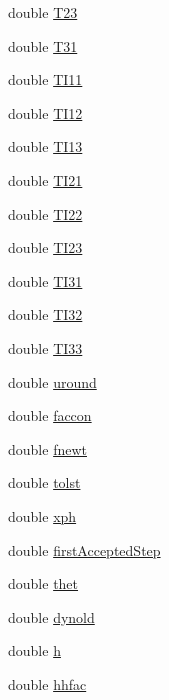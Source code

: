 \begin{DoxyCompactItemize}
double \hyperlink{classodes_1_1Radau5cc_a7a1d50f08a07a822568cbe9d52b75d45}{T23}
\item 
double \hyperlink{classodes_1_1Radau5cc_ab80295b9270d7ac0dde3e7d36dcff866}{T31}
\item 
double \hyperlink{classodes_1_1Radau5cc_a50cc7d8eee62bccf6069a4c1f43d019b}{T\+I11}
\item 
double \hyperlink{classodes_1_1Radau5cc_aaed25bf9d94e2cbbbeed75c093c0406f}{T\+I12}
\item 
double \hyperlink{classodes_1_1Radau5cc_a6da247a0623462bb1d61e5c97d67a39f}{T\+I13}
\item 
double \hyperlink{classodes_1_1Radau5cc_a14b80d1886a7562f3a72ce7acd738272}{T\+I21}
\item 
double \hyperlink{classodes_1_1Radau5cc_a77584ef2a5a6cccef4fe531e95c800d7}{T\+I22}
\item 
double \hyperlink{classodes_1_1Radau5cc_aafd01d1393c2dbe3edc148f073bf24f6}{T\+I23}
\item 
double \hyperlink{classodes_1_1Radau5cc_a0b21d463e63aaa3ae216def4605ed64a}{T\+I31}
\item 
double \hyperlink{classodes_1_1Radau5cc_a6707fd7852c5536fcdc9a85cb78cef5c}{T\+I32}
\item 
double \hyperlink{classodes_1_1Radau5cc_a6641ca56a3e50256303f70f839365c93}{T\+I33}
\item 
double \hyperlink{classodes_1_1Radau5cc_aecb9b0f5b18f8bb94a14435e20bdd65b}{uround}
\item 
double \hyperlink{classodes_1_1Radau5cc_ae3cb85f022d29c80ae8f980e57f1bbf5}{faccon}
\item 
double \hyperlink{classodes_1_1Radau5cc_af6debb655768cb0a251e2886544d87cb}{fnewt}
\item 
double \hyperlink{classodes_1_1Radau5cc_abdf9186a294f8720b8d5100335b6e39a}{tolst}
\item 
double \hyperlink{classodes_1_1Radau5cc_a9f9ba87113cef033764f5282f987a832}{xph}
\item 
double \hyperlink{classodes_1_1Radau5cc_a1a7b580bbae9fcd5c49fa116e877ac5c}{first\+Accepted\+Step}
\item 
double \hyperlink{classodes_1_1Radau5cc_a340c376fb3c4521c3c8e95a7b9911792}{thet}
\item 
double \hyperlink{classodes_1_1Radau5cc_a5d60671c8cf94cc855a57a2afe201565}{dynold}
\item 
double \hyperlink{classodes_1_1Radau5cc_afa3dc089844e77046c958a4ff2dcab1a}{h}
\item 
double \hyperlink{classodes_1_1Radau5cc_ad853d1040e37757aad020edde3b2ec28}{hhfac}

\end{DoxyCompactItemize}
